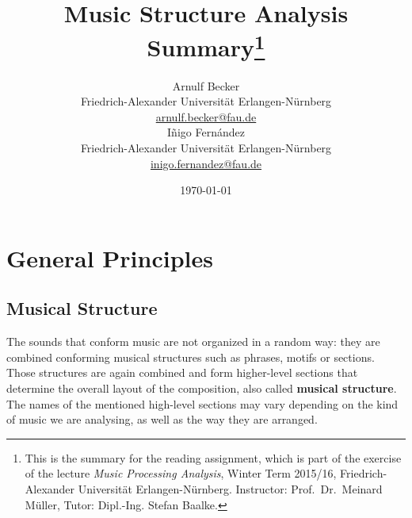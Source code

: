 \documentclass[a4paper, 9pt, twocolumn]{extarticle}
\begin{document}
\date{\normalsize \today}

\title{\vspace{-8mm}\textbf{\LARGE
Music Structure Analysis Summary\footnote{This is the summary for the reading assignment,
which is part of the exercise of the lecture \emph{Music Processing Analysis}, Winter Term 2015/16,
Friedrich-Alexander Universit\"at Erlangen-N\"urnberg.
Instructor: Prof.\ Dr.\ Meinard M\"uller,
Tutor: Dipl.-Ing. Stefan Baalke.
}}}

\author{
{
\begin{minipage}[t]{.45\textwidth}
\center
Arnulf Becker\\
\small
Friedrich-Alexander Universit\"at Erlangen-N\"urnberg
\protect\\{} %
\url{arnulf.becker@fau.de}
\end{minipage}%
\begin{minipage}[t]{.45\textwidth}
\center
Iñigo Fern\' andez\\
\small
Friedrich-Alexander Universit\"at Erlangen-N\"urnberg
\protect\\{} %
\url{inigo.fernandez@fau.de}
\end{minipage}%
}
}
 
\maketitle
\thispagestyle{empty}


\section{General Principles} 
\label{section:generalPrinciples}

\subsection{Musical Structure}  
The sounds that conform music are not organized in a random way: they are combined conforming musical structures such as phrases, motifs or sections. Those structures are again combined and form higher-level sections that determine the overall layout of the composition, also called \textbf{musical structure}. The names of the mentioned high-level sections may vary depending on the kind of music we are analysing, as well as the way they are arranged. 
\end{document}

